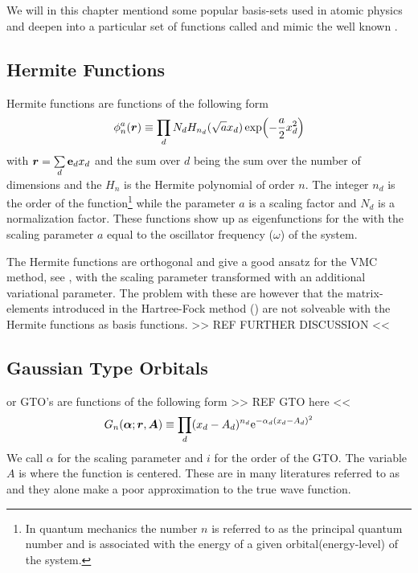 \chapter{\label{chapter:4}}
    We will in this chapter mentiond some popular basis-sets used in atomic
    physics and deepen into a particular set of functions called
     and mimic the well known .

\section{Hermite Functions}
    Hermite functions are functions of the following form
        \begin{equation}
            \phi^a_n(\boldsymbol{{r}}) \equiv \prod_d N_d
            H_{n_d}(\sqrt{a}x_d)\exp(-\frac{a}{2}x^2_d)
            \label{eq:HermiteFunc}
        \end{equation}
    with $\boldsymbol{{r}} = \sum\limits_d \boldsymbol{{\mathrm{e}}}_dx_d$ and the sum over $d$ being
    the sum over the number of dimensions and the $H_n$ is the Hermite
    polynomial of order $n$. The integer $n_d$ is the order of the
    function\footnote{In quantum mechanics the number $n$ is referred to as the
    principal quantum number and is associated with the energy of a given
    orbital(energy-level) of the system.} while the parameter $a$ is a scaling
    factor and $N_d$ is a normalization factor. These functions show up as
    eigenfunctions for the \cite{GriffQuan} with the scaling parameter $a$ equal to the
    oscillator frequency ($\omega$) of the system.

    The Hermite functions are orthogonal and give a good ansatz for the VMC
    method, see , with the scaling parameter transformed with an
    additional variational parameter. The problem with these are however that
    the matrix-elements introduced in the Hartree-Fock method
    () are not solveable with the Hermite functions as basis
    functions. >> REF FURTHER DISCUSSION <<

\section{Gaussian Type Orbitals}
     or GTO's are functions of the following form
    >> REF GTO here <<
        \begin{equation}
            G_n(\boldsymbol{{\alpha}};\boldsymbol{{r}},\boldsymbol{{A}}) \equiv \prod_d (x_d-A_d)^{n_d}
            \mathrm{e}^{-\alpha_d (x_d-A_d)^2}
            \label{eq:GTOdef1d}
        \end{equation}
    We call $\alpha$ for the scaling parameter and $i$ for the order of the
    GTO. The variable $A$ is where the function is centered. These are in many
    literatures referred to as  and they alone
    make a poor approximation to the true wave function.

